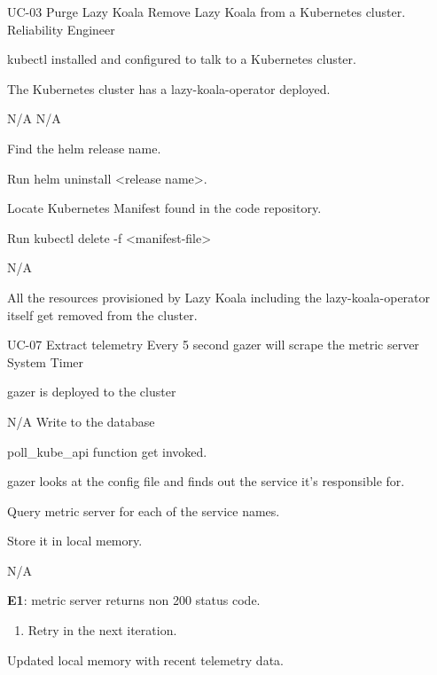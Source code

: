 \vspace{-2em}
\UseCaseDescription
{UC-03}
{Purge Lazy Koala}
{Remove Lazy Koala from a Kubernetes cluster.}
{Reliability Engineer}
{\begin{CompactItemizes}
    \item kubectl installed and configured to talk to a Kubernetes cluster.
    \item The Kubernetes cluster has a \ac{lazy-koala-operator} deployed.
\end{CompactItemizes}}
{N/A}
{N/A}
{\begin{CompactEnumerate}
    \item Find the helm release name.
    \item Run helm uninstall <release name>.
\end{CompactEnumerate}}
{{\begin{CompactEnumerate}
    \item Locate Kubernetes Manifest found in the code repository.
    \item Run kubectl delete -f <manifest-file>
\end{CompactEnumerate}}
{N/A}
{\begin{CompactItemizes}
    \item All the resources provisioned by Lazy Koala including the \ac{lazy-koala-operator} itself get removed from the cluster.
\end{CompactItemizes}}}

\vspace{-2em}
\UseCaseDescription
{UC-07}
{Extract telemetry}
{Every 5 second \ac{gazer} will scrape the metric server}
{System Timer}
{\begin{CompactItemizes}
    \item \ac{gazer} is deployed to the cluster
\end{CompactItemizes}}
{N/A}
{Write to the database}
{\begin{CompactEnumerate}
    \item poll\_kube\_api function get invoked.
    \item \ac{gazer} looks at the config file and finds out the service it’s responsible for.
    \item Query metric server for each of the service names.
    \item Store it in local memory.
\end{CompactEnumerate}}
{{N/A}
{\textbf{E1}: metric server returns non 200 status code.
\vspace{-4mm}\begin{enumerate}
    \item Retry in the next iteration.
\vspace{-7mm}\end{enumerate}}
{\begin{CompactItemizes}
    \item Updated local memory with recent telemetry data.
\end{CompactItemizes}}}

